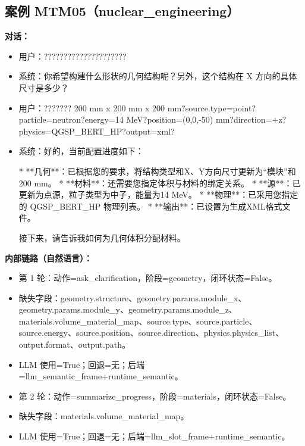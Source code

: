 \documentclass[11pt]{ctexart}
\begin{document}
\subsection{案例 MTM05（nuclear\_engineering）}
\textbf{对话：}
\begin{itemize}
\item 用户：?????????????????????
\item 系统：你希望构建什么形状的几何结构呢？另外，这个结构在 X 方向的具体尺寸是多少？
\item 用户：??????? 200 mm x 200 mm x 200 mm?source.type=point?particle=neutron?energy=14 MeV?position=(0,0,-50) mm?direction=+z?physics=QGSP\_BERT\_HP?output=xml?
\item 系统：好的，当前配置进度如下：

*   **几何**：已根据您的要求，将结构类型和X、Y方向尺寸更新为“模块”和200 mm。
*   **材料**：还需要您指定体积与材料的绑定关系。
*   **源**：已更新为点源，粒子类型为中子，能量为14 MeV。
*   **物理**：已采用您指定的 QGSP\_BERT\_HP 物理列表。
*   **输出**：已设置为生成XML格式文件。

接下来，请告诉我如何为几何体积分配材料。
\end{itemize}
\textbf{内部链路（自然语言）：}
\begin{itemize}
\item 第 1 轮：动作=ask\_clarification，阶段=geometry，闭环状态=False。
\item 缺失字段：geometry.structure、geometry.params.module\_x、geometry.params.module\_y、geometry.params.module\_z、materials.volume\_material\_map、source.type、source.particle、source.energy、source.position、source.direction、physics.physics\_list、output.format、output.path。
\item LLM 使用=True；回退=无；后端=llm\_semantic\_frame+runtime\_semantic。
\item 第 2 轮：动作=summarize\_progress，阶段=materials，闭环状态=False。
\item 缺失字段：materials.volume\_material\_map。
\item LLM 使用=True；回退=无；后端=llm\_slot\_frame+runtime\_semantic。
\end{itemize}
\end{document}
